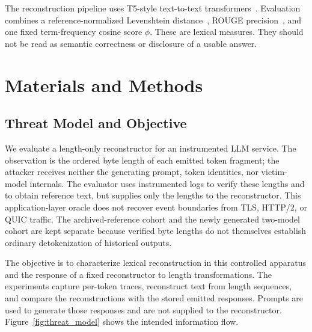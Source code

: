 \documentclass[electronics,article,submit,pdftex,moreauthors]{Definitions/mdpi}
\begin{document}
The reconstruction pipeline uses T5-style text-to-text transformers~\cite{raffel2020exploring}. Evaluation combines a reference-normalized Levenshtein distance~\cite{levenshtein1966binary}, ROUGE precision~\cite{lin2004rouge}, and one fixed term-frequency cosine score $\phi$. These are lexical measures. They should not be read as semantic correctness or disclosure of a usable answer.

\section{Materials and Methods}
\subsection{Threat Model and Objective}
We evaluate a length-only reconstructor for an instrumented LLM service. The observation is the ordered byte length of each emitted token fragment; the attacker receives neither the generating prompt, token identities, nor victim-model internals. The evaluator uses instrumented logs to verify these lengths and to obtain reference text, but supplies only the lengths to the reconstructor. This application-layer oracle does not recover event boundaries from TLS, HTTP/2, or QUIC traffic. The archived-reference cohort and the newly generated two-model cohort are kept separate because verified byte lengths do not themselves establish ordinary detokenization of historical outputs.

The objective is to characterize lexical reconstruction in this controlled apparatus and the response of a fixed reconstructor to length transformations. The experiments capture per-token traces, reconstruct text from length sequences, and compare the reconstructions with the stored emitted responses. Prompts are used to generate those responses and are not supplied to the reconstructor. Figure~\ref{fig:threat_model} shows the intended information flow.
\end{document}

